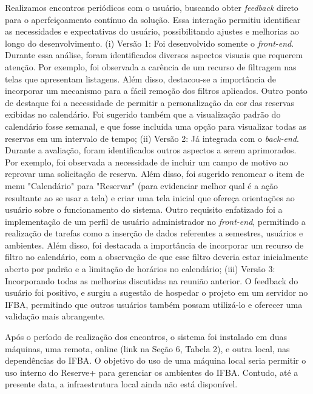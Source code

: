 \documentclass[12pt]{article}
\begin{document}
Realizamos encontros periódicos com o usuário, buscando obter \textit{feedback} direto para o aperfeiçoamento contínuo da solução. Essa interação permitiu identificar as necessidades e expectativas do usuário, possibilitando ajustes e melhorias ao longo do desenvolvimento. (i) Versão 1: Foi desenvolvido somente o \textit{front-end}. Durante essa análise, foram identificados diversos aspectos visuais que requerem atenção. Por exemplo, foi observada a carência de um recurso de filtragem nas telas que apresentam listagens. Além disso, destacou-se a importância de incorporar um mecanismo para a fácil remoção dos filtros aplicados. Outro ponto de destaque foi a necessidade de permitir a personalização da cor das reservas exibidas no calendário. Foi sugerido também que a visualização padrão do calendário fosse semanal, e que fosse incluída uma opção para visualizar todas as reservas em um intervalo de tempo; (ii) Versão 2: Já integrada com o \textit{back-end}. Durante a avaliação, foram identificados outros aspectos a serem aprimorados. Por exemplo, foi observada a necessidade de incluir um campo de motivo ao reprovar uma solicitação de reserva. Além disso, foi sugerido renomear o item de menu "Calendário" para "Reservar" (para evidenciar melhor qual é a ação resultante ao se usar a tela) e criar uma tela inicial que ofereça orientações ao usuário sobre o funcionamento do sistema. Outro requisito enfatizado foi a implementação de um perfil de usuário administrador no \textit{front-end}, permitindo a realização de tarefas como a inserção de dados referentes a semestres, usuários e ambientes. Além disso, foi destacada a importância de incorporar um recurso de filtro no calendário, com a observação de que esse filtro deveria estar inicialmente aberto por padrão e a limitação de horários no calendário; (iii) Versão 3: Incorporando todas as melhorias discutidas na reunião anterior. O feedback do usuário foi positivo, e surgiu a sugestão de hospedar o projeto em um servidor no IFBA, permitindo que outros usuários também possam utilizá-lo e oferecer uma validação mais abrangente.

Após o período de realização dos encontros, o sistema foi instalado em duas máquinas, uma remota, online (link na Seção 6, Tabela 2), e outra local, nas dependências do IFBA. O objetivo do uso de uma máquina local seria permitir o uso interno do Reserve+ para gerenciar os ambientes do IFBA. Contudo, até a presente data, a infraestrutura local ainda não está disponível.
\end{document}

